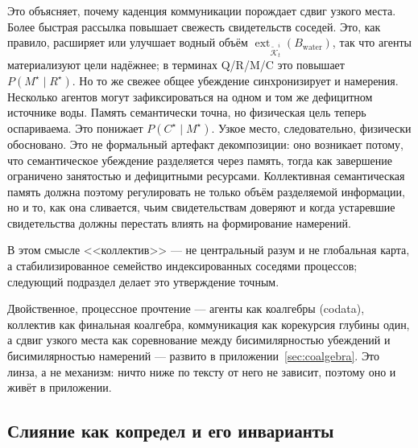 \documentclass{article}
\begin{document}
Это объясняет, почему каденция коммуникации порождает сдвиг узкого
места. Более быстрая рассылка повышает свежесть свидетельств соседей.
Это, как правило, расширяет или улучшает водный объём
$\operatorname{ext}_{\widetilde{\mathcal{K}}_t^i}(B_{\mathrm{water}})$,
так что агенты материализуют цели надёжнее; в терминах Q/R/M/C это
повышает $P(M^\star\mid R^\star)$. Но то же свежее общее убеждение
синхронизирует и намерения. Несколько агентов могут зафиксироваться на
одном и том же дефицитном источнике воды. Память семантически точна,
но физическая цель теперь оспариваема. Это понижает $P(C^\star\mid
M^\star)$. Узкое место, следовательно, физически обосновано. Это не
формальный артефакт декомпозиции: оно возникает потому, что
семантическое убеждение разделяется через память, тогда как завершение
ограничено занятостью и дефицитными ресурсами. Коллективная
семантическая память должна поэтому регулировать не только объём
разделяемой информации, но и то, как она сливается, чьим
свидетельствам доверяют и когда устаревшие свидетельства должны
перестать влиять на формирование намерений.

В этом смысле <<коллектив>> --- не центральный разум и не глобальная
карта, а стабилизированное семейство индексированных соседями
процессов; следующий подраздел делает это утверждение точным.

Двойственное, процессное прочтение --- агенты как коалгебры (codata),
коллектив как финальная коалгебра, коммуникация как корекурсия глубины
один, а сдвиг узкого места как соревнование между бисимилярностью
убеждений и бисимилярностью намерений --- развито в
приложении~\ref{sec:coalgebra}. Это линза, а не механизм: ничто ниже
по тексту от него не зависит, поэтому оно и живёт в приложении.

\subsection{Слияние как копредел и его инварианты}
\label{sec:colimit}
\end{document}
